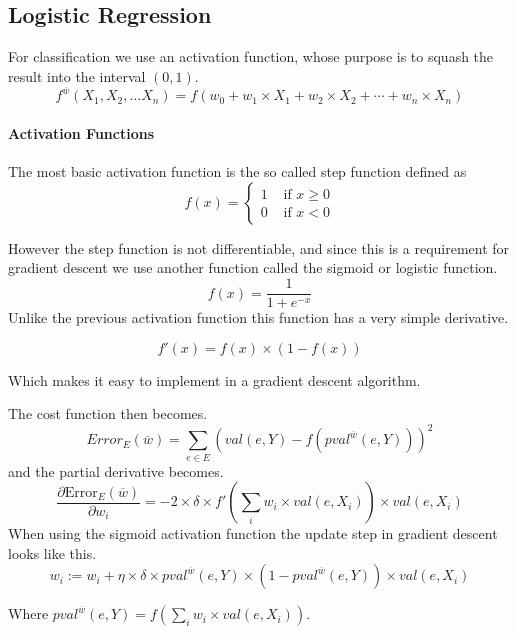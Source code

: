 \subsection{Logistic Regression}\label{sec:logistic}

For classification we use an activation function, whose purpose is to squash the result into the interval $(0,1)$.
\[ f^{\overline{w}}(X_1, X_2, \dots X_n) = f(w_0 + w_1 \times X_1 + w_2 \times X_2 + \cdots + w_n \times X_n) \]

\paragraph{Activation Functions}

The most basic activation function is the so called step function defined as 
\[ f(x) = \begin{cases}

	1 &\text{ if } x \geq 0 \\
	0 &\text{ if } x < 0 
\end{cases}\]

However the step function is not differentiable, and since this is a requirement for gradient descent we use another
function called the sigmoid or logistic function.
\[ f(x) = \frac{1}{1+e^{-x}} \]
Unlike the previous activation function this function has a very simple derivative.

\[ f'(x) = f(x) \times (1-f(x)) \]

Which makes it easy to implement in a gradient descent algorithm.

The cost function then becomes.
\[ Error_E(\overline{w}) = \sum_{e \in E} \left(val(e,Y)-f\left(pval^{\overline{w}}(e,Y)\right)\right)^2 \]
and the partial derivative becomes.
\[ \frac{\partial \text{Error}_E(\overline{w})}{\partial w_i} 
	= -2 \times \delta \times f'\left(\sum_i w_i \times val(e,X_i)\right) \times val(e,X_i) \]
When using the sigmoid activation function the update step in gradient descent looks like this.
\[ w_i := w_i + \eta \times \delta \times pval^{\overline{w}}(e,Y) \times \left(1 - pval^{\overline{w}}(e,Y)\right) \times val(e,X_i) \]

Where $pval^{\overline{w}}(e,Y) = f(\sum_i w_i \times val(e,X_i))$.  


\begin{flushright}
\cite[p. 306-307]{AI2010}
\end{flushright}


